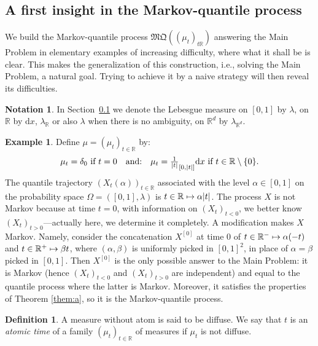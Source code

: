 \documentclass[11pt]{article}
\makeatletter
\newcommand{\ie}{i.e.,\xspace}
\newcommand\mto{\mathchoice{\longmapsto}{\mapsto}{\mapsto}{\mapsto}}
\DeclareRobustCommand{\mathbbm}[1]{\csname jepbb@#1\endcsname}
\theoremstyle{plain}
\theoremstyle{definition}
\newtheorem{defi}[them]{Definition}
\newtheorem{notation}[them]{Notation} %
\newtheorem{ex}[them]{Example}
\newcommand{\dd}{\mathrm{d}}
\newcommand{\mq}{\mathfrak{MQ}}
\newcommand{\one}{\mathbbm{1}}
\newcommand{\la}{\lambda}
\newcommand{\R}{\mathbb{R}}
\makeatother
\begin{document}
\subsection{A first insight in the Markov-quantile process}\label{subsec:intro_quantilemarkovien}

We build the Markov-quantile process $\mq((\mu_t)_{t\R})$ answering the Main Problem in elementary examples of increasing difficulty, where what it shall be is clear. This makes the generalization of this construction, \ie solving the Main Problem, a natural goal. Trying to achieve it by a naive strategy will then reveal its difficulties.

\begin{notation}\label{not:leb}
In Section~\ref{subsec:intro_quantilemarkovien} we denote the Lebesgue measure on $[0,1]$ by $\la$, on~$\R$ by $\dd x$, $\la_\R$ or also $\la$ when there is no ambiguity, on $\R^d$ by $\la_{\R^d}$.
\end{notation}

\begin{ex}\label{ex1}Define $\mu=(\mu_t)_{t\in\R}$ by:
\[\textstyle\mu_t=\delta_0\ \text{if }t=0\quad \text{and:}\quad \mu_t=\frac{1}{|t|}\one_{[0,|t|]}\dd x\ \text{if }t\in \R\setminus \{0\}.\]
The quantile trajectory $(X_t(\alpha))_{t\in\R}$ associated with the level $\alpha\in [0,1]$ on the probability space $\Omega=([0,1],\la)$ is $t\in \R\mto \alpha|t|$. The process $X$ is not Markov because at time $t=0$, with information on $(X_t)_{t<0}$, we better know $(X_t)_{t>0}$---actually here, we determine it completely. A modification makes $X$ Markov. Namely, consider the concatenation $X^{[0]}$ at time $0$ of $t\in \R^-\mto\alpha(-t)$ and $t\in \R^+\mto\beta t$, where $(\alpha,\beta)$ is uniformly picked in $[0,1]^2$, in place of $\alpha=\beta$ picked in $[0,1]$. Then $X^{[0]}$ is the only possible answer to the Main Problem: it is Markov (hence $(X_t)_{t<0}$ and $(X_t)_{t>0}$ are independent) and equal to the quantile process where the latter is Markov. Moreover, it satisfies the properties of Theorem \ref{them:a}, so it is the Markov-quantile process.
\end{ex}

\begin{defi}\label{defi:atomic}A measure without atom is said to be diffuse. We say that $t$ is an \emph{atomic time} of a family $(\mu_t)_{t\in\R}$ of measures if $\mu_t$ is not diffuse.
\end{defi}
\end{document}
